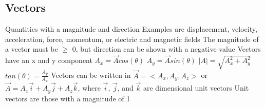 \documentclass[11 pt, twoside]{article}
\newenvironment{outline*}
{
	\begin{outline}[enumerate]
	}
	{\end{outline}
}
\begin{document}
\subsection{Vectors}
\begin{outline*}
\1 Quantities with a magnitude and direction
\1 Examples are displacement, velocity, acceleration, force, momentum, or electric and magnetic fields
\1 The magnitude of a vector must be $\geq$ 0, but direction can be shown with a negative value
\1 Vectors have an x and y component
\2 $A_x = \vec{A}cos(\theta)$
\2 $A_y = \vec{A}sin(\theta)$
\2 $|A| = \sqrt{A_x^2 + A_y^2}$
\2 $tan(\theta) = \frac{A_y}{A_x}$
\1 Vectors can be written in $\vec{A} = <A_x, A_y, A_z>$ or $\vec{A} = A_x\vec{i} + A_y\vec{j} + A_z\vec{k}$, where $\vec{i}$, $\vec{j}$, and $\vec{k}$ are dimensional unit vectors
\2 Unit vectors are those with a magnitude of 1
\end{outline*}
\end{document}
